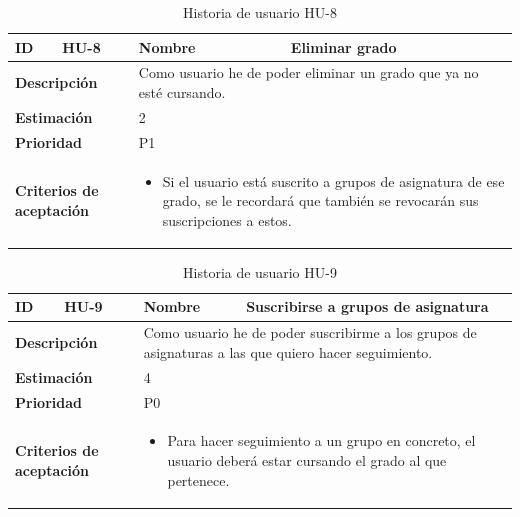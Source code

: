 \begin{table}[H]
    \centering
    \begin{tabular}{|p{2cm}|p{4cm}|p{2cm}|p{4cm}|}
        \hline
        \textbf{ID} & HU-8 & \textbf{Nombre} & Eliminar grado \\
        \hline
        \multicolumn{2}{|p{6cm}|}{\textbf{Descripción}} & \multicolumn{2}{p{6cm}|}{Como usuario he de poder eliminar un grado que ya no esté cursando.} \\
        \hline
        \multicolumn{2}{|p{6cm}|}{\textbf{Estimación}} & \multicolumn{2}{p{6cm}|}{2} \\
        \hline
        \multicolumn{2}{|p{6cm}|}{\textbf{Prioridad}} & \multicolumn{2}{p{6cm}|}{P1} \\
        \hline
        \multicolumn{2}{|p{6cm}|}{\textbf{Criterios de aceptación}} & \multicolumn{2}{p{6cm}|}{
            \begin{itemize}
                \item Si el usuario está suscrito a grupos de asignatura de ese grado, se le recordará que también se revocarán sus suscripciones a estos.
            \end{itemize}
        } \\
        \hline
    \end{tabular}
    \caption{Historia de usuario HU-8}
    \label{tab:hu_8}
\end{table}

\begin{table}[H]
    \centering
    \begin{tabular}{|p{2cm}|p{4cm}|p{2cm}|p{4cm}|}
        \hline
        \textbf{ID} & HU-9 & \textbf{Nombre} & Suscribirse a grupos de asignatura \\
        \hline
        \multicolumn{2}{|p{6cm}|}{\textbf{Descripción}} & \multicolumn{2}{p{6cm}|}{Como usuario he de poder suscribirme a los grupos de asignaturas a las que quiero hacer seguimiento.} \\
        \hline
        \multicolumn{2}{|p{6cm}|}{\textbf{Estimación}} & \multicolumn{2}{p{6cm}|}{4} \\
        \hline
        \multicolumn{2}{|p{6cm}|}{\textbf{Prioridad}} & \multicolumn{2}{p{6cm}|}{P0} \\
        \hline
        \multicolumn{2}{|p{6cm}|}{\textbf{Criterios de aceptación}} & \multicolumn{2}{p{6cm}|}{
            \begin{itemize}
                \item Para hacer seguimiento a un grupo en concreto, el usuario deberá estar cursando el grado al que pertenece.
            \end{itemize}
        } \\
        \hline
    \end{tabular}
    \caption{Historia de usuario HU-9}
    \label{tab:hu_9}
\end{table}

